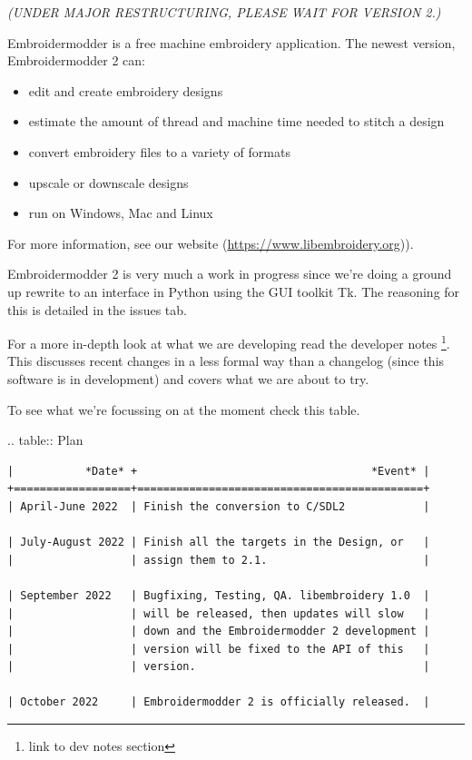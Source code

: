 \documentclass[11pt]{report}
\begin{document}
\emph{(UNDER MAJOR RESTRUCTURING, PLEASE WAIT FOR VERSION 2.)}

Embroidermodder is a free machine embroidery application.
The newest version, Embroidermodder 2 can:

\begin{itemize}
\item edit and create embroidery designs
\item estimate the amount of thread and machine time needed to stitch a design
\item convert embroidery files to a variety of formats
\item upscale or downscale designs
\item run on Windows, Mac and Linux
\end{itemize}

For more information, see our website (\url{https://www.libembroidery.org})).

Embroidermodder 2 is very much a work in progress since we're doing a ground up
rewrite to an interface in Python using the GUI toolkit Tk. The reasoning for
this is detailed in the issues tab.

For a more in-depth look at what we are developing read the developer notes
\footnote{link to dev notes section}. This discusses recent changes in a less
formal way than a changelog (since this software is in development) and covers
what we are about to try.

To see what we're focussing on at the moment check this table.

.. table:: Plan

\begin{lstlisting}
|           *Date* +                                    *Event* |
+==================+============================================+
| April-June 2022  | Finish the conversion to C/SDL2            |

| July-August 2022 | Finish all the targets in the Design, or   |
|                  | assign them to 2.1.                        |

| September 2022   | Bugfixing, Testing, QA. libembroidery 1.0  |
|                  | will be released, then updates will slow   |
|                  | down and the Embroidermodder 2 development |
|                  | version will be fixed to the API of this   |
|                  | version.                                   |

| October 2022     | Embroidermodder 2 is officially released.  |
\end{lstlisting}
\end{document}
